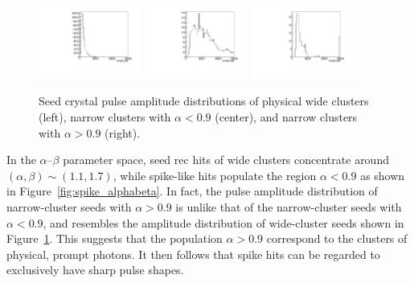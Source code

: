 \begin{figure}[tbp]
  \begin{center}
    \includegraphics[width=0.3\textwidth]{Reconstruction/Figures/spikes/physical_amplitude.pdf}
    \includegraphics[width=0.3\textwidth]{Reconstruction/Figures/spikes/spike_amplitude.pdf}
    \includegraphics[width=0.3\textwidth]{Reconstruction/Figures/spikes/narrow_largealpha_amplitude.pdf}
    \caption{
      Seed crystal pulse amplitude distributions of physical wide clusters (left), narrow clusters with $\alpha < 0.9$ (center), and narrow clusters with $\alpha > 0.9$ (right).
    }
    \label{fig:spike_amplitudes}
  \end{center}
\end{figure}

In the $\alpha$--$\beta$ parameter space, seed rec hits of wide clusters concentrate around $(\alpha, \beta) \sim (1.1, 1.7)$, while spike-like hits populate the region $\alpha < 0.9$ as shown in Figure~\ref{fig:spike_alphabeta}.
In fact, the pulse amplitude distribution of narrow-cluster seeds with $\alpha > 0.9$ is unlike that of the narrow-cluster seeds with $\alpha < 0.9$, and resembles the amplitude distribution of wide-cluster seeds shown in Figure~\ref{fig:spike_amplitudes}.
This suggests that the population $\alpha > 0.9$ correspond to the clusters of physical, prompt photons.
It then follows that spike hits can be regarded to exclusively have sharp pulse shapes.
\fi
